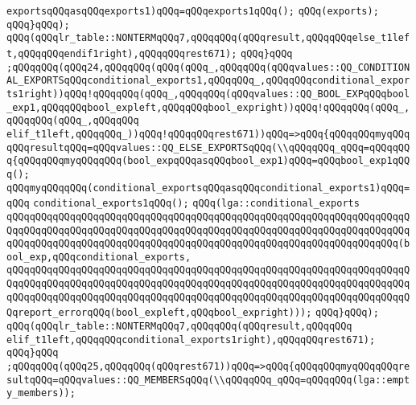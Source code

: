 \verb|exportsqQQqasqQQqexports1)qQQq=qQQqexports1qQQq();|\newline
\verb|qQQq(exports);|\newline
\verb|qQQq}qQQq);|\newline
\verb|qQQq(qQQqlr_table::NONTERMqQQq7,qQQqqQQq(qQQqresult,qQQqqQQqelse_t1left,qQQqqQQqendif1right),qQQqqQQqrest671);|\newline
\verb|qQQq}qQQq|\newline
\verb|;qQQqqQQq(qQQq24,qQQqqQQq(qQQq(qQQq_,qQQqqQQq(qQQqvalues::QQ_CONDITIONAL_EXPORTSqQQqconditional_exports1,qQQqqQQq_,qQQqqQQqconditional_exports1right))qQQq!qQQqqQQq(qQQq_,qQQqqQQq(qQQqvalues::QQ_BOOL_EXPqQQqbool_exp1,qQQqqQQqbool_expleft,qQQqqQQqbool_expright))qQQq!qQQqqQQq(qQQq_,qQQqqQQq(qQQq_,qQQqqQQq|\newline
\verb|elif_t1left,qQQqqQQq_))qQQq!qQQqqQQqrest671))qQQq=>qQQq{qQQqqQQqmyqQQqqQQqresultqQQq=qQQqvalues::QQ_ELSE_EXPORTSqQQq(\\qQQqqQQq_qQQq=qQQqqQQq{qQQqqQQqmyqQQqqQQq(bool_expqQQqasqQQqbool_exp1)qQQq=qQQqbool_exp1qQQq();|\newline
\verb|qQQqmyqQQqqQQq(conditional_exportsqQQqasqQQqconditional_exports1)qQQq=qQQq|\newline
\verb|conditional_exports1qQQq();|\newline
\verb|qQQq(lga::conditional_exports|\newline
\verb|qQQqqQQqqQQqqQQqqQQqqQQqqQQqqQQqqQQqqQQqqQQqqQQqqQQqqQQqqQQqqQQqqQQqqQQqqQQqqQQqqQQqqQQqqQQqqQQqqQQqqQQqqQQqqQQqqQQqqQQqqQQqqQQqqQQqqQQqqQQqqQQqqQQqqQQqqQQqqQQqqQQqqQQqqQQqqQQqqQQqqQQqqQQqqQQqqQQqqQQqqQQqqQQq(bool_exp,qQQqconditional_exports,|\newline
\verb|qQQqqQQqqQQqqQQqqQQqqQQqqQQqqQQqqQQqqQQqqQQqqQQqqQQqqQQqqQQqqQQqqQQqqQQqqQQqqQQqqQQqqQQqqQQqqQQqqQQqqQQqqQQqqQQqqQQqqQQqqQQqqQQqqQQqqQQqqQQqqQQqqQQqqQQqqQQqqQQqqQQqqQQqqQQqqQQqqQQqqQQqqQQqqQQqqQQqqQQqqQQqqQQqqQQqreport_errorqQQq(bool_expleft,qQQqbool_expright)));|\newline
\verb|qQQq}qQQq);|\newline
\verb|qQQq(qQQqlr_table::NONTERMqQQq7,qQQqqQQq(qQQqresult,qQQqqQQq|\newline
\verb|elif_t1left,qQQqqQQqconditional_exports1right),qQQqqQQqrest671);|\newline
\verb|qQQq}qQQq|\newline
\verb|;qQQqqQQq(qQQq25,qQQqqQQq(qQQqrest671))qQQq=>qQQq{qQQqqQQqmyqQQqqQQqresultqQQq=qQQqvalues::QQ_MEMBERSqQQq(\\qQQqqQQq_qQQq=qQQqqQQq(lga::empty_members));|\newline
